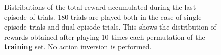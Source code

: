 \begin{figure}[H]
	\centering
	\caption{Distributions of the total reward accumulated during the last
	episode of trials. 180 trials are played both in the case of
	single-episode trials and dual-episode trials. This shows the
	distribution of rewards obtained after playing 10 times each
	permutation of the \textbf{training} set. No action inversion is performed.}
	\label{fig:20perms_distrib}
\end{figure}

